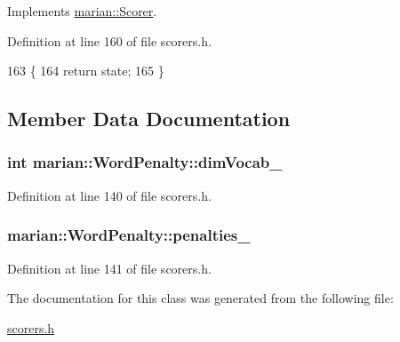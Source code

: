 Implements \hyperlink{classmarian_1_1Scorer_a377f003fbab702227d0aa895af54a94a}{marian\+::\+Scorer}.



Definition at line 160 of file scorers.\+h.


\begin{DoxyCode}
163                                                                      \{
164     \textcolor{keywordflow}{return} state;
165   \}
\end{DoxyCode}


\subsection{Member Data Documentation}
\subsubsection[{\texorpdfstring{dim\+Vocab\+\_\+}{dimVocab_}}]{\setlength{\rightskip}{0pt plus 5cm}int marian\+::\+Word\+Penalty\+::dim\+Vocab\+\_\+\hspace{0.3cm}{\ttfamily [private]}}\hypertarget{classmarian_1_1WordPenalty_ac3c89ea288afeb1a53b09c471dba52ae}{}\label{classmarian_1_1WordPenalty_ac3c89ea288afeb1a53b09c471dba52ae}


Definition at line 140 of file scorers.\+h.

\subsubsection[{\texorpdfstring{penalties\+\_\+}{penalties_}}]{ marian\+::\+Word\+Penalty\+::penalties\+\_\+\hspace{0.3cm}{\ttfamily [private]}}\hypertarget{classmarian_1_1WordPenalty_a6e9da9f4df99aea84ce07fa74fdb922a}{}\label{classmarian_1_1WordPenalty_a6e9da9f4df99aea84ce07fa74fdb922a}


Definition at line 141 of file scorers.\+h.



The documentation for this class was generated from the following file\+:\begin{DoxyCompactItemize}
\item 
\hyperlink{scorers_8h}{scorers.\+h}\end{DoxyCompactItemize}
